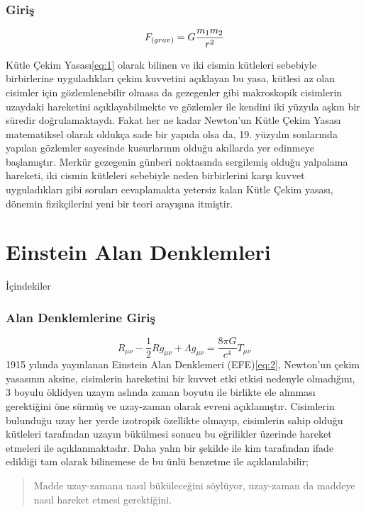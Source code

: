 \documentclass{beamer}
\begin{document}
    \begin{frame}
    \frametitle{Giriş}
        
        \begin{equation}
        \label{eq:1}
        F_{\text(grav)} = G \frac{m_1 m_2}{r^2}
        \end{equation}
        
        Kütle Çekim Yasası\ref{eq:1} olarak bilinen ve iki cismin kütleleri sebebiyle birbirlerine uyguladıkları çekim kuvvetini açıklayan bu yasa, kütlesi az olan cisimler için gözlemlenebilir olmasa da gezegenler gibi makroskopik cisimlerin uzaydaki hareketini açıklayabilmekte ve gözlemler ile kendini iki yüzyıla aşkın bir süredir doğrulamaktaydı. Fakat her ne kadar Newton'un Kütle Çekim Yasası matematiksel olarak oldukça sade bir yapıda olsa da, 19. yüzyılın sonlarında yapılan gözlemler sayesinde kusurlarının olduğu akıllarda yer edinmeye başlamıştır. Merkür gezegenin günberi noktasında sergilemiş olduğu yalpalama hareketi, iki cismin kütleleri sebebiyle neden birbirlerini karşı kuvvet uyguladıkları gibi soruları cevaplamakta yetersiz kalan Kütle Çekim yasası, dönemin fizikçilerini yeni bir teori arayışına itmiştir.
    \end{frame}

\section{Einstein Alan Denklemleri}
    \begin{frame}{İçindekiler}      
        \tableofcontents[currentsection]

    \end{frame}
    \begin{frame}
        \frametitle{Alan Denklemlerine Giriş}
        \begin{equation}
            \label{eq:2}
            R_{\mu\nu} - \frac{1}{2}Rg_{\mu\nu} + \Lambda g_{\mu\nu} = \frac{8\pi G}{c^4}T_{\mu\nu}
        \end{equation}
        1915 yılında yayınlanan Einstein Alan Denklemeri (EFE)\ref{eq:2}, Newton'un çekim yasasının aksine, cisimlerin hareketini bir kuvvet etki etkisi nedenyle olmadığını, 3 boyulu öklidyen uzayın aslında zaman boyutu ile birlikte ele alınması gerektiğini öne sürmüş ve uzay-zaman olarak evreni açıklamıştır. Cisimlerin bulunduğu uzay her yerde izotropik özellikte olmayıp, cisimlerin sahip olduğu kütleleri tarafından uzayın bükülmesi sonucu bu eğrilikler üzerinde hareket etmeleri ile açıklanmaktadır.\cite{Hartle2021} Daha yalın bir şekilde ile kim tarafından ifade edildiği tam olarak bilinemese de bu ünlü benzetme ile açıklanılabilir;
        \begin{quote}
            Madde uzay-zamana nasıl büküleceğini söylüyor, uzay-zaman da maddeye nasıl hareket etmesi gerektiğini.
        \end{quote}
        
    \end{frame}
\end{document}

